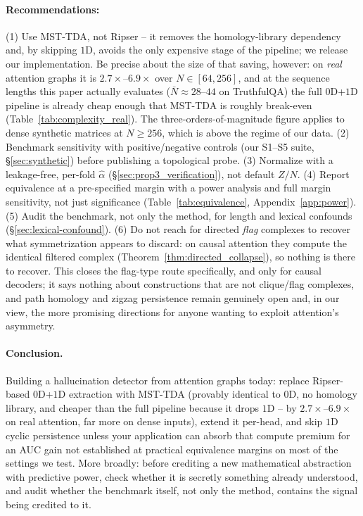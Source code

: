 \documentclass{article}
\begin{document}
\paragraph{Recommendations:} (1) Use MST-TDA, not Ripser -- it removes the homology-library dependency and, by skipping $1$D, avoids the only expensive stage of the pipeline; we release our implementation. Be precise about the size of that saving, however: on \emph{real} attention graphs it is $2.7\times$--$6.9\times$ over $N\in[64,256]$, and at the sequence lengths this paper actually evaluates ($\bar N \approx 28$--$44$ on TruthfulQA) the full $0$D+$1$D pipeline is already cheap enough that MST-TDA is roughly break-even (Table~\ref{tab:complexity_real}). The three-orders-of-magnitude figure applies to dense synthetic matrices at $N \ge 256$, which is above the regime of our data. (2) Benchmark sensitivity with positive/negative controls (our S1--S5 suite, \S\ref{sec:synthetic}) before publishing a topological probe. (3) Normalize with a leakage-free, per-fold $\hat\alpha$ (\S\ref{sec:prop3_verification}), not default $Z/N$. (4) Report equivalence at a pre-specified margin with a power analysis and full margin sensitivity, not just significance (Table~\ref{tab:equivalence}, Appendix~\ref{app:power}). (5) Audit the benchmark, not only the method, for length and lexical confounds (\S\ref{sec:lexical-confound}). (6) Do not reach for directed \emph{flag} complexes to recover what symmetrization appears to discard: on causal attention they compute the identical filtered complex (Theorem~\ref{thm:directed_collapse}), so nothing is there to recover. This closes the flag-type route specifically, and only for causal decoders; it says nothing about constructions that are not clique/flag complexes, and path homology \citep{grigoryan2014, grigoryan2018} and zigzag persistence \citep{carlsson2010} remain genuinely open and, in our view, the more promising directions for anyone wanting to exploit attention's asymmetry.

\paragraph{Conclusion.} Building a hallucination detector from attention graphs today: replace Ripser-based $0$D+$1$D extraction with MST-TDA (provably identical to $0$D, no homology library, and cheaper than the full pipeline because it drops $1$D -- by $2.7\times$--$6.9\times$ on real attention, far more on dense inputs), extend it per-head, and skip $1$D cyclic persistence unless your application can absorb that compute premium for an AUC gain not established at practical equivalence margins on most of the settings we test. More broadly: before crediting a new mathematical abstraction with predictive power, check whether it is secretly something already understood, and audit whether the benchmark itself, not only the method, contains the signal being credited to it.
\end{document}
